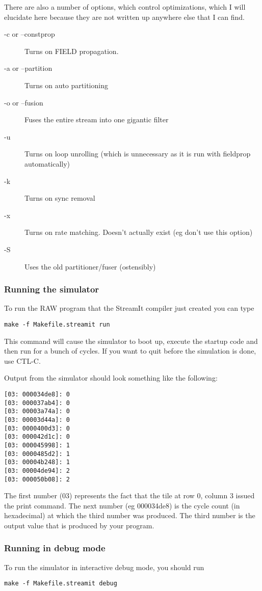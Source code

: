 There are also a number of options, which control optimizations,
which I will elucidate here because they are not written up anywhere
else that I can find.
\begin{description}
\item [-c or --constprop] Turns on FIELD propagation.
\item [-a or --partition] Turns on auto partitioning
\item [-o or --fusion] Fuses the entire stream into one gigantic filter
\item [-u] Turns on loop unrolling (which is unnecessary as it is run with fieldprop automatically)
\item [-k] Turns on sync removal
\item [-x] Turns on rate matching. Doesn't actually exist (eg don't use this option)
\item [-S] Uses the old partitioner/fuser (ostensibly)
\end{description}


\subsubsection{Running the simulator}
To run the RAW program that the StreamIt compiler just created
you can type 

\begin{verbatim}make -f Makefile.streamit run\end{verbatim}

This command will cause the simulator to boot up, execute the startup code
and then run for a bunch of cycles. If you want to quit before the 
simulation is done, use CTL-C. 

Output from the simulator should look something like the following:
\begin{verbatim}
[03: 000034de8]: 0
[03: 000037ab4]: 0
[03: 00003a74a]: 0
[03: 00003d44a]: 0
[03: 0000400d3]: 0
[03: 000042d1c]: 0
[03: 000045998]: 1
[03: 0000485d2]: 1
[03: 00004b248]: 1
[03: 00004de94]: 2
[03: 000050b08]: 2
\end{verbatim}

The first number (03) represents the fact that the tile at row 0, column 3
issued the print command. The next number 
(eg 000034de8) is the cycle count (in hexadecimal) at which the third number was produced. The 
third number is the output value that is produced by your program.

\subsubsection{Running in debug mode}
To run the simulator in interactive debug mode, you should run
\begin{verbatim}make -f Makefile.streamit debug\end{verbatim}

